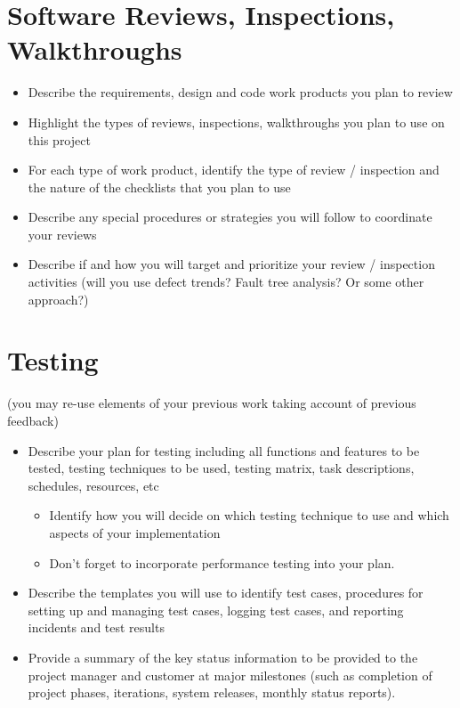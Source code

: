 \documentclass[11pt]{wacomepd}
\begin{document}
\chapter{Software Reviews, Inspections, Walkthroughs}
\begin{itemize}
\item Describe the requirements, design and code work products you plan to review
\item Highlight the types of reviews, inspections, walkthroughs you plan to use on this project
\item For each type of work product, identify the type of review / inspection and the nature of the
  checklists that you plan to use
\item Describe any special procedures or strategies you will follow to coordinate your reviews
\item Describe if and how you will target and prioritize your review / inspection activities (will
  you use defect trends? Fault tree analysis? Or some other approach?)
\end{itemize}



\chapter{Testing}
(you may re-use elements of your previous work taking account of previous feedback)
\begin{itemize}
\item Describe your plan for testing including all functions and features to be tested, testing
  techniques to be used, testing matrix, task descriptions, schedules, resources, etc
  \begin{itemize}
  \item Identify how you will decide on which testing technique to use and which aspects of your
    implementation
  \item Don’t forget to incorporate performance testing into your plan.
  \end{itemize}
\item Describe the templates you will use to identify test cases, procedures for setting up and
  managing test cases, logging test cases, and reporting incidents and test results
\item Provide a summary of the key status information to be provided to the project manager and
  customer at major milestones (such as completion of project phases, iterations, system releases,
  monthly status reports).
\end{itemize}
\end{document}
